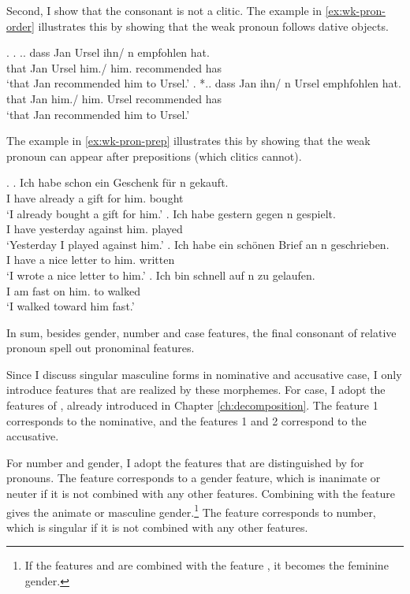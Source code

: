 Second, I show that the consonant is not a clitic.
The example in \ref{ex:wk-pron-order} illustrates this by showing that the weak pronoun follows dative objects.

\ex.\label{ex:wk-pron-order}
\ag. .. dass Jan Ursel ihn/ n empfohlen hat.\\
 {} that Jan Ursel him./ him. recommended has\\
 `that Jan recommended him to Ursel.'
\bg. *.. dass Jan ihn/ n Ursel emphfohlen hat.\\
 {} that Jan him./ him. Ursel recommended has\\
 `that Jan recommended him to Ursel.'

The example in \ref{ex:wk-pron-prep} illustrates this by showing that the weak pronoun can appear after prepositions (which clitics cannot).

\ex.\label{ex:wk-pron-prep}
\ag. Ich habe schon ein Geschenk für n gekauft.\\
 I have already a gift for him. bought\\
 `I already bought a gift for him.'
\bg. Ich habe gestern gegen n gespielt.\\
I have yesterday against him. played\\
`Yesterday I played against him.'
\bg. Ich habe ein schönen Brief an n geschrieben.\\
I have a nice letter to him. written\\
`I wrote a nice letter to him.'
\bg. Ich bin schnell auf n zu gelaufen.\\
I am fast on him. to walked\\
`I walked toward him fast.'

In sum, besides gender, number and case features, the final consonant of relative pronoun spell out pronominal features.

Since I discuss singular masculine forms in nominative and accusative case, I only introduce features that are realized by these morphemes.
For case, I adopt the features of \citet{caha2009}, already introduced in Chapter \ref{ch:decomposition}. The feature 1 corresponds to the nominative, and the features 1 and 2 correspond to the accusative.

For number and gender, I adopt the features that are distinguished by \citet{harley2002} for pronouns. The feature  corresponds to a gender feature, which is inanimate or neuter if it is not combined with any other features. Combining  with the feature  gives the animate or masculine gender.\footnote{
If the features  and  are combined with the feature , it becomes the feminine gender.
}
The feature  corresponds to number, which is singular if it is not combined with any other features.


